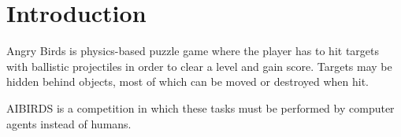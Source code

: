 \section{Introduction}\label{sec:intro}

Angry Birds is physics-based puzzle game where the player has to hit targets with ballistic projectiles in order to clear a level and gain score.
Targets may be hidden behind objects, most of which can be moved or destroyed when hit.

AIBIRDS is a competition in which these tasks must be performed by computer agents instead of humans.


